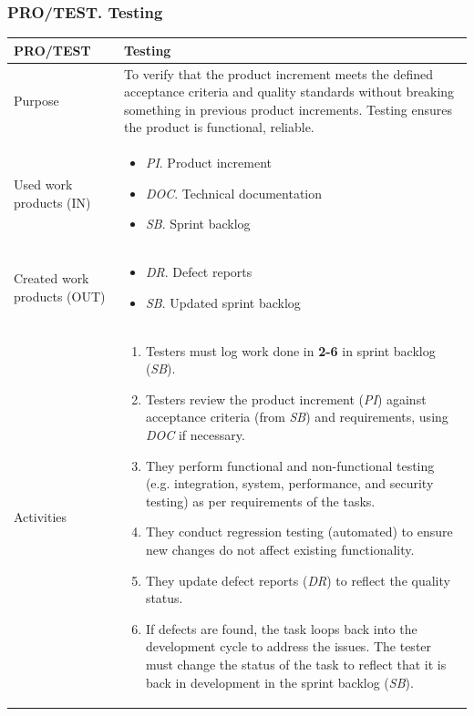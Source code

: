 \newpage
\subsubsection{PRO/TEST. Testing}

\begin{table}[h!]
\begin{tabular}{l|p{}}
\hline
\textbf{PRO/TEST}        & \textbf{Testing} \\ \hline
Purpose & To verify that the product increment meets the defined acceptance criteria and quality standards without breaking something in previous product increments. Testing ensures the product is functional, reliable. \\ \hline
Used work products (IN)    &      
\begin{itemize}
    \item \textit{PI}. Product increment
    \item \textit{DOC}. Technical documentation
    \item \textit{SB}. Sprint backlog
\end{itemize}
\\ \hline
Created work products (OUT) &     
\begin{itemize}
    \item \textit{DR}. Defect reports
    \item \textit{SB}. Updated sprint backlog
\end{itemize}
\\ \hline
Activities            &   
\begin{enumerate}
    \item Testers must log work done in \textbf{2-6} in sprint backlog (\textit{SB}).
    \item Testers review the product increment (\textit{PI}) against acceptance criteria (from \textit{SB}) and requirements, using \textit{DOC} if necessary.
    \item They perform functional and non-functional testing (e.g. integration, system, performance, and security testing) as per requirements of the tasks.
    \item They conduct regression testing (automated) to ensure new changes do not affect existing functionality.
    \item They update defect reports (\textit{DR}) to reflect the quality status.
    \item If defects are found, the task loops back into the development cycle to address the issues. The tester must change the status of the task to reflect that it is back in development in the sprint backlog (\textit{SB}).
\end{enumerate}
\end{tabular}
\label{quality_assurance_process}
\end{table}

